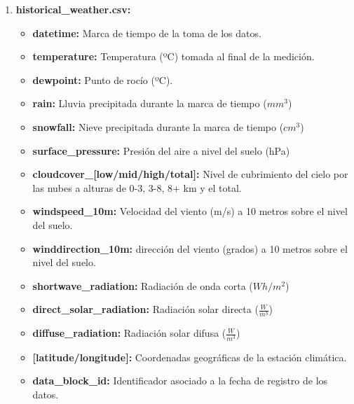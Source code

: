 \documentclass[a4paper,12pt]{article}
\begin{document}
\begin{enumerate}
    \item \textbf{historical\_weather.csv:}
    \begin{itemize}
        \item \textbf{datetime:} 
        Marca de tiempo de la toma de los datos.

        \item \textbf{temperature:} Temperatura 
        (ºC) tomada al final de la medición.

        \item \textbf{dewpoint:} 
        Punto de rocío (ºC).

        \item \textbf{rain:}
        Lluvia precipitada durante la marca de tiempo ($mm^{3}$)

        \item \textbf{snowfall:}
        Nieve precipitada durante la marca de tiempo ($cm^{3}$)

        \item \textbf{surface\_pressure:} 
        Presión del aire a nivel del suelo (hPa)

        \item \textbf{cloudcover\_[low/mid/high/total]:}
        Nivel de cubrimiento del cielo por las nubes a
        alturas de 0-3, 3-8, 8+ km y el total. 

        \item \textbf{windspeed\_10m:} Velocidad del viento (m/s) 
        a 10 metros sobre el nivel del suelo.

        \item \textbf{winddirection\_10m:} dirección del viento
        (grados) a 10 metros sobre el nivel del suelo.

        \item \textbf{shortwave\_radiation:} 
        Radiación de onda corta ($Wh/m^{2}$)

        \item \textbf{direct\_solar\_radiation:}
        Radiación solar directa ($\frac{W}{m^{3}}$)

        \item \textbf{diffuse\_radiation:}
        Radiación solar difusa ($\frac{W}{m^{3}}$)

        \item \textbf{[latitude/longitude]:} 
        Coordenadas geográficas de la estación climática.
        
        \item \textbf{data\_block\_id:}
        Identificador asociado a la fecha de registro de los datos.

    \end{itemize}

\end{enumerate}
\end{document}
